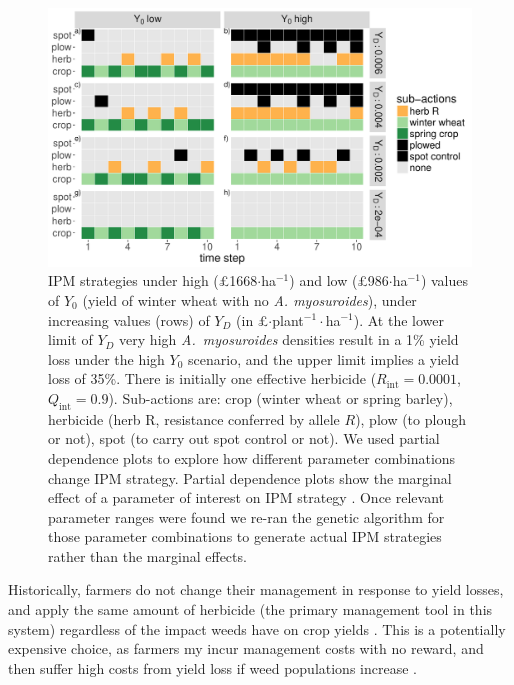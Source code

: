 \documentclass[9pt,twocolumn,twoside,lineno]{pnas-new}
\begin{document}
\begin{figure}
	\centering
	\includegraphics[width=1\linewidth]{MS_act_seq_YD_Y0.pdf}
	\caption{IPM strategies under high (\pounds 1668$\cdot$ha$^{-1}$) and low (\pounds 986$\cdot$ha$^{-1}$) values of $Y_0$ (yield of winter wheat with no \textit{A. myosuroides}), under increasing values (rows) of $Y_D$ (in \pounds$\cdot$plant$^{-1}\cdot$ha$^{-1}$). At the lower limit of $Y_D$ very high \textit{A.\ myosuroides} densities result in a 1\% yield loss under the high $Y_0$ scenario, and the upper limit implies a yield loss of 35\%. There is initially one effective herbicide ($R_\text{int} = 0.0001$, $Q_\text{int} = 0.9$). Sub-actions are: crop (winter wheat or spring barley), herbicide (herb R, resistance conferred by allele $R$), plow (to plough or not), spot (to carry out spot control or not). We used partial dependence plots to explore how different parameter combinations change IPM strategy. Partial dependence plots show the marginal effect of a parameter of interest on IPM strategy \citep{Frie2001, Mill2016}. Once relevant parameter ranges were found we re-ran the genetic algorithm for those parameter combinations to generate actual IPM strategies rather than the marginal effects.}
	\label{fig:Y0_YD} 
\end{figure}

Historically, farmers do not change their management in response to yield losses, and apply the same amount of herbicide (the primary management tool in this system) regardless of the impact weeds have on crop yields \citep{Hick2018}. This is a potentially expensive choice, as farmers my incur management costs with no reward, and then suffer high costs from yield loss if weed populations increase \citep{Hick2018}.         
\end{document}
